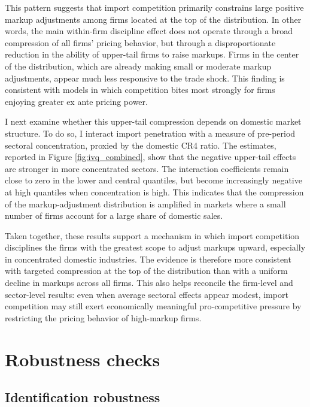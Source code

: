 \documentclass[12pt]{article}
\begin{document}
This pattern suggests that import competition primarily constrains large positive markup adjustments among firms located at the top of the distribution. In other words, the main within-firm discipline effect does not operate through a broad compression of all firms' pricing behavior, but through a disproportionate reduction in the ability of upper-tail firms to raise markups. Firms in the center of the distribution, which are already making small or moderate markup adjustments, appear much less responsive to the trade shock. This finding is consistent with models in which competition bites most strongly for firms enjoying greater ex ante pricing power.

I next examine whether this upper-tail compression depends on domestic market structure. To do so, I interact import penetration with a measure of pre-period sectoral concentration, proxied by the domestic CR4 ratio. The estimates, reported in Figure \ref{fig:ivq_combined}, show that the negative upper-tail effects are stronger in more concentrated sectors. The interaction coefficients remain close to zero in the lower and central quantiles, but become increasingly negative at high quantiles when concentration is high. This indicates that the compression of the markup-adjustment distribution is amplified in markets where a small number of firms account for a large share of domestic sales.

Taken together, these results support a mechanism in which import competition disciplines the firms with the greatest scope to adjust markups upward, especially in concentrated domestic industries. The evidence is therefore more consistent with targeted compression at the top of the distribution than with a uniform decline in markups across all firms. This also helps reconcile the firm-level and sector-level results: even when average sectoral effects appear modest, import competition may still exert economically meaningful pro-competitive pressure by restricting the pricing behavior of high-markup firms.

\section{Robustness checks}

\subsection{Identification robustness}
\end{document}
